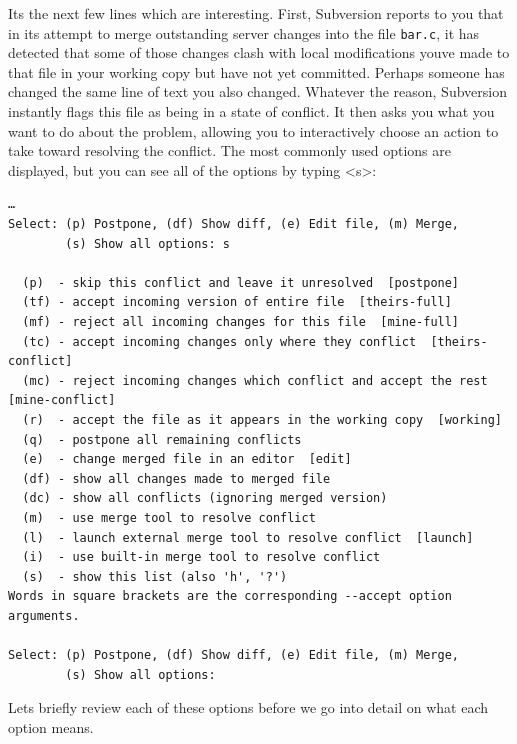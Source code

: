 It\textquotesingle s the next few lines which are interesting. First,
Subversion reports to you that in its attempt to merge outstanding
server changes into the file \texttt{bar.c}, it has detected that some
of those changes clash with local modifications you\textquotesingle ve
made to that file in your working copy but have not yet committed.
Perhaps someone has changed the same line of text you also changed.
Whatever the reason, Subversion instantly flags this file as being in a
state of conflict. It then asks you what you want to do about the
problem, allowing you to interactively choose an action to take toward
resolving the conflict. The most commonly used options are displayed,
but you can see all of the options by typing \textless s\textgreater:

\begin{verbatim}
…
Select: (p) Postpone, (df) Show diff, (e) Edit file, (m) Merge,
        (s) Show all options: s

  (p)  - skip this conflict and leave it unresolved  [postpone]
  (tf) - accept incoming version of entire file  [theirs-full]
  (mf) - reject all incoming changes for this file  [mine-full]
  (tc) - accept incoming changes only where they conflict  [theirs-conflict]
  (mc) - reject incoming changes which conflict and accept the rest  [mine-conflict]
  (r)  - accept the file as it appears in the working copy  [working]
  (q)  - postpone all remaining conflicts
  (e)  - change merged file in an editor  [edit]
  (df) - show all changes made to merged file
  (dc) - show all conflicts (ignoring merged version)
  (m)  - use merge tool to resolve conflict
  (l)  - launch external merge tool to resolve conflict  [launch]
  (i)  - use built-in merge tool to resolve conflict
  (s)  - show this list (also 'h', '?')
Words in square brackets are the corresponding --accept option arguments.

Select: (p) Postpone, (df) Show diff, (e) Edit file, (m) Merge,
        (s) Show all options:
\end{verbatim}

Let\textquotesingle s briefly review each of these options before we go
into detail on what each option means.

